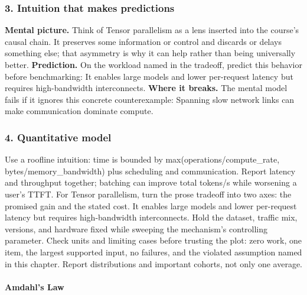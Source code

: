 \subsubsection*{3. Intuition that makes predictions}
\textbf{Mental picture.} Think of Tensor parallelism as a lens inserted into the course's causal chain. It preserves some information or control and discards or delays something else; that asymmetry is why it can help rather than being universally better.
\textbf{Prediction.} On the workload named in the tradeoff, predict this behavior before benchmarking: It enables large models and lower per-request latency but requires high-bandwidth interconnects.
\textbf{Where it breaks.} The mental model fails if it ignores this concrete counterexample: Spanning slow network links can make communication dominate compute.
\subsubsection*{4. Quantitative model}
Use a roofline intuition: time is bounded by max(operations/compute\_rate, bytes/memory\_bandwidth) plus scheduling and communication. Report latency and throughput together; batching can improve total tokens/s while worsening a user's TTFT.
For Tensor parallelism, turn the prose tradeoff into two axes: the promised gain and the stated cost. It enables large models and lower per-request latency but requires high-bandwidth interconnects. Hold the dataset, traffic mix, versions, and hardware fixed while sweeping the mechanism's controlling parameter.
Check units and limiting cases before trusting the plot: zero work, one item, the largest supported input, no failures, and the violated assumption named in this chapter. Report distributions and important cohorts, not only one average.
\paragraph{Amdahl's Law}
